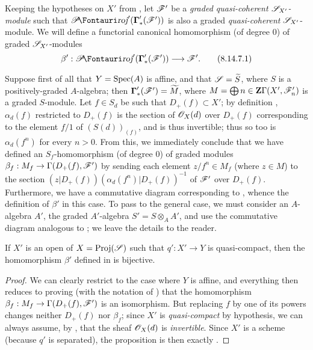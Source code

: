 \begin{env}[8.14.7]
\label{II.8.14.7}
Keeping the hypotheses on $X'$ from , let $\mathscr{F}'$ be a \emph{graded quasi-coherent $\mathscr{S}_{X'}$-module} such that $\shProj'(\boldsymbol{\Gamma}'_*(\sh{F}'))$ is also a graded \emph{quasi-coherent} $\mathscr{S}_{X'}$-module.
We will define a functorial canonical homomorphism (of degree $0$) of graded $\mathscr{S}_{X'}$-modules
\[
\label{II.8.14.7.1}
    \beta': \shProj'(\boldsymbol{\Gamma}'_*(\sh{F}')) \to \sh{F}'.
\tag{8.14.7.1}
\]

Suppose first of all that $Y=\operatorname{Spec}(A)$ is affine, and that $\mathscr{S}=\widetilde{S}$, where $S$ is a positively-graded $A$-algebra;
then $\boldsymbol{\Gamma}'_*(\mathscr{F}')=\widetilde{M}$, where $M=\bigoplus{n\in\mathbf{Z}}\Gamma(X',\mathscr{F}'_n)$ is a graded $S$-module.
Let $f\in S_d$ be such that $D_+(f)\subset X'$;
by definition , $\alpha_d(f)$ restricted to $D_+(f)$ is the section of $\mathscr{O}_X(d)$ over $D_+(f)$ corresponding to the element $f/1$ of $(S(d))_{(f)}$, and is thus invertible;
thus so too is $\alpha_d(f^n)$ for every $n>0$.
From this, we immediately conclude that we have defined an $S_f$-homomorphism (of degree $0$) of graded modules $\beta_f:M_f\to\Gamma(D_+(f),\sh{F}')$ by sending each element $z/f^n\in M_f$ (where $z\in M$) to the section $(z|D_+(f))(\alpha_d(f^n)|D_+(f))^{-1}$ of $\mathscr{F}'$ over $D_+(f)$.
Furthermore, we have a commutative diagram corresponding to , whence the definition of $\beta'$ in this case.
To pass to the general case, we must consider an $A$-algebra $A'$, the graded $A'$-algebra $S'=S\otimes_A A'$, and use the commutative diagram analogous to ;
we leave the details to the reader.
\end{env}

\begin{proposition}[8.14.8]
\label{II.8.14.8}
If $X'$ is an open of $X=\operatorname{Proj}(\mathscr{S})$ such that $q':X'\to Y$ is quasi-compact, then the homomorphism $\beta'$ defined in  is bijective.
\end{proposition}

\begin{proof}
We can clearly restrict to the case where $Y$ is affine, and everything then reduces to proving (with the notation of ) that the homomorphism $\beta_f:M_f\to\Gamma(D_+(f),\sh{F}')$ is an isomorphism.
But replacing $f$ by one of its powers changes neither $D_+(f)$ nor $\beta_f$;
since $X'$ is \emph{quasi-compact} by hypothesis, we can always assume, by , that the sheaf $\mathscr{O}_X(d)$ is \emph{invertible}.
Since $X'$ is a scheme (because $q'$ is separated), the proposition is then exactly .
\end{proof}

